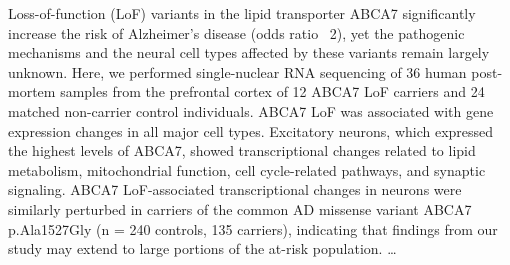 Loss-of-function (LoF) variants in the lipid transporter ABCA7 significantly increase the risk of Alzheimer’s disease (odds ratio ~2), yet the pathogenic mechanisms and the neural cell types affected by these variants remain largely unknown. Here, we performed single-nuclear RNA sequencing of 36 human post-mortem samples from the prefrontal cortex of 12 ABCA7 LoF carriers and 24 matched non-carrier control individuals. ABCA7 LoF was associated with gene expression changes in all major cell types. Excitatory neurons, which expressed the highest levels of ABCA7, showed transcriptional changes related to lipid metabolism, mitochondrial function, cell cycle-related pathways, and synaptic signaling. ABCA7 LoF-associated transcriptional changes in neurons were similarly perturbed in carriers of the common AD missense variant ABCA7 p.Ala1527Gly (n = 240 controls, 135 carriers), indicating that findings from our study may extend to large portions of the at-risk population. 
\dots

